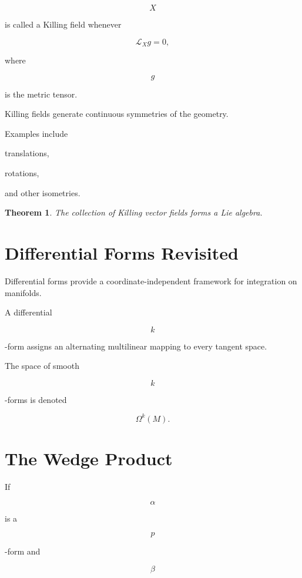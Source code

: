 \documentclass[11pt,fleqn]{book}
\numberwithin{equation}{chapter}
\theoremstyle{plain}
\newtheorem{theorem}{Theorem}[chapter]
\theoremstyle{definition}
\theoremstyle{remark}
\begin{document}
\[
X
\]

is called a Killing field whenever

\[
\boxed{
\mathcal L_Xg
=
0,
}
\]

where

\[
g
\]

is the metric tensor.

Killing fields generate continuous symmetries of the geometry.

Examples include

translations,

rotations,

and other isometries.


\begin{theorem}

The collection of Killing vector fields forms a Lie algebra.

\end{theorem}


\section{Differential Forms Revisited}

Differential forms provide a coordinate-independent framework for
integration on manifolds.

A differential

\[
k
\]

-form assigns an alternating multilinear mapping to every tangent space.

The space of smooth

\[
k
\]

-forms is denoted

\[
\Omega^k(M).
\]


\section{The Wedge Product}

If

\[
\alpha
\]

is a

\[
p
\]

-form and

\[
\beta
\]
\end{document}
